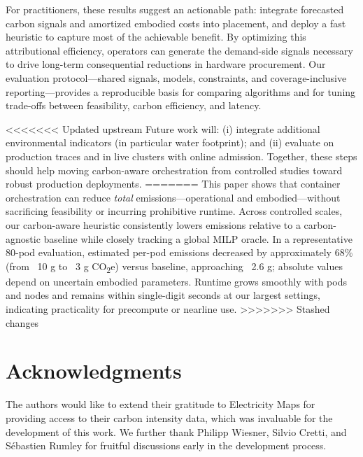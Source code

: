 \documentclass[10pt,journal,compsoc]{IEEEtran}
\begin{document}
For practitioners, these results suggest an actionable path: integrate forecasted carbon signals and amortized embodied costs into placement, and deploy a fast heuristic to capture most of the achievable benefit. By optimizing this attributional efficiency, operators can generate the demand-side signals necessary to drive long-term consequential reductions in hardware procurement. Our evaluation protocol—shared signals, models, constraints, and coverage-inclusive reporting—provides a reproducible basis for comparing algorithms and for tuning trade-offs between feasibility, carbon efficiency, and latency.

<<<<<<< Updated upstream
Future work will: (i) integrate additional environmental indicators (in particular water footprint); and (ii) evaluate on production traces and in live clusters with online admission. Together, these steps should help moving carbon-aware orchestration from controlled studies toward robust production deployments.
=======
This paper shows that container orchestration can reduce \emph{total} emissions—operational and embodied—without sacrificing feasibility or incurring prohibitive runtime. Across controlled scales, our carbon-aware heuristic consistently lowers emissions relative to a carbon-agnostic baseline while closely tracking a global MILP oracle. In a representative 80-pod evaluation, estimated per-pod emissions decreased by approximately 68\% (from ~10 g to ~3 g CO\textsubscript{2}e) versus baseline, approaching ~2.6 g; absolute values depend on uncertain embodied parameters. Runtime grows smoothly with pods and nodes and remains within single-digit seconds at our largest settings, indicating practicality for precompute or nearline use.
>>>>>>> Stashed changes

\section*{Acknowledgments}
The authors would like to extend their gratitude to Electricity Maps for providing access to their carbon intensity data, which was invaluable for the development of this work. We further thank Philipp Wiesner, Silvio Cretti, and Sébastien Rumley for fruitful discussions early in the development process.



\end{document}
